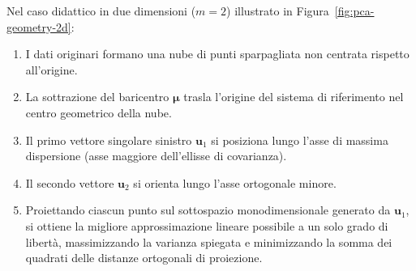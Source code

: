 Nel caso didattico in due dimensioni ($m = 2$) illustrato in Figura~\ref{fig:pca-geometry-2d}:
\begin{enumerate}
    \item I dati originari formano una nube di punti sparpagliata non centrata rispetto all'origine.
    \item La sottrazione del baricentro $\boldsymbol{\mu}$ trasla l'origine del sistema di riferimento nel centro geometrico della nube.
    \item Il primo vettore singolare sinistro $\mathbf{u}_1$ si posiziona lungo l'asse di massima dispersione (asse maggiore dell'ellisse di covarianza).
    \item Il secondo vettore $\mathbf{u}_2$ si orienta lungo l'asse ortogonale minore.
    \item Proiettando ciascun punto sul sottospazio monodimensionale generato da $\mathbf{u}_1$, si ottiene la migliore approssimazione lineare possibile a un solo grado di libert\`a, massimizzando la varianza spiegata e minimizzando la somma dei quadrati delle distanze ortogonali di proiezione.
\end{enumerate}

